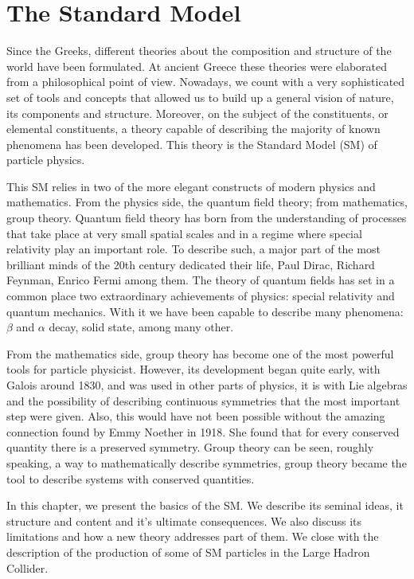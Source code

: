 \chapter[The Standard Model]{The Standard Model}
\label{chap:SM}
Since the Greeks, different theories about the composition and structure of the world have been formulated. At ancient Greece these theories were elaborated from a philosophical point of view. Nowadays, we count with a very sophisticated  set of tools and concepts that allowed us to build up a general vision of nature, its components and structure. Moreover, on the subject of the constituents, or elemental constituents, a theory capable of describing the majority of known phenomena has been developed. This theory is the Standard Model (SM) of particle physics. 

This SM relies in two of the more elegant constructs of modern physics and mathematics. From the physics side, the quantum field theory; from mathematics, group theory. Quantum field theory has born from the understanding of processes that take place at very small spatial scales and in a regime where special relativity play an important role. To describe such, a major part of the most brilliant minds of the 20th century dedicated their life, Paul Dirac, Richard Feynman, Enrico Fermi among them. The theory of quantum fields has set in a common place two extraordinary achievements of physics: special relativity and quantum mechanics. With it we have been capable to describe many phenomena: $\beta$ and $\alpha$ decay, solid state, among many other.

From the mathematics side, group theory has become one of the most powerful tools for particle physicist. However, its development began quite early, with Galois around 1830, and was used in other parts of physics, it is with Lie algebras and the possibility of describing continuous symmetries that the most important step were given. Also, this would have not been possible without the amazing connection found by Emmy Noether in 1918. She found that for every conserved quantity there is a preserved symmetry. Group theory can be seen, roughly speaking, a way to mathematically describe symmetries, group theory became the tool to describe systems with conserved quantities. 

In this chapter, we present the basics of the SM. We describe its seminal ideas, it structure and content and it's ultimate consequences. We also discuss its limitations and how a new theory addresses part of them. We close with the description of the production of some of SM particles in the Large Hadron Collider.  

